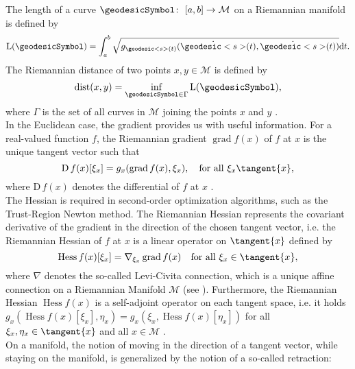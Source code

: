 The length of a curve $\geodesicSymbol \colon \ [a,b] \to \mathcal{M}$ on a Riemannian manifold is defined by
\begin{equation*}
    \mathrm{L}(\geodesicSymbol) = \int^{b}_a \sqrt{ g_{\geodesic<s>(t)} (\dot{\geodesic<s>}(t), \dot{\geodesic<s>}(t)) } \mathrm{d}t.
\end{equation*}
The Riemannian distance of two points $x,y \in \mathcal{M}$ is defined by
\begin{equation*}
    \operatorname{dist}(x,y) = \inf_{\geodesicSymbol \in \Gamma} \mathrm{L}(\geodesicSymbol),
\end{equation*}
where $\Gamma$ is the set of all curves in $\mathcal{M}$ joining the points $x$ and $y$ \cite[p.~46]{AbsilMahonySepulchre:2008}. \\
In the Euclidean case, the gradient provides us with useful information. For a real-valued function $f$, the Riemannian gradient $\operatorname{grad} f(x)$ of $f$ at $x$ is the unique tangent vector such that
\begin{equation*}
    \mathrm{D} \, f(x) [\xi_x] = g_x (\operatorname{grad} f(x), \xi_x), \quad \text{for all } \xi_x \tangent{x},
\end{equation*}
where $\mathrm{D} \, f(x)$ denotes the differential of $f$ at $x$ \cite[p.~46]{AbsilMahonySepulchre:2008}. \\
The Hessian is required in second-order optimization algorithms, such as the Trust-Region Newton method. The Riemannian Hessian represents the covariant derivative of the gradient in the direction of the chosen tangent vector, i.e. the Riemannian Hessian of $f$ at $x$ is a linear operator on $\tangent{x}$ defined by
\begin{equation*}
    \operatorname{Hess} f(x) [\xi_{x}] = \nabla_{\xi_{x}} \operatorname{grad} f(x) \quad \text{for all } \xi_x \in \tangent{x},
\end{equation*}
where $\nabla$ denotes the so-called Levi-Civita connection, which is a unique affine connection on a Riemannian Manifold $\mathcal{M}$ (see \cite[Theorem~5.3.1~(Levi-Civita)]{AbsilMahonySepulchre:2008}). Furthermore, the Riemannian Hessian $\operatorname{Hess} f(x)$ is a self-adjoint operator on each tangent space, i.e. it holds $g_x(\operatorname{Hess} f(x) [\xi_{x}], \eta_x) = g_x(\xi_{x}, \operatorname{Hess} f(x) [\eta_x])$ for all $\xi_x, \eta_x \in \tangent{x}$ and all $x \in \mathcal{M}$ \cite[p.~105]{AbsilMahonySepulchre:2008}. \\
On a manifold, the notion of moving in the direction of a tangent vector, while staying on the manifold, is generalized by the notion of a so-called retraction:
